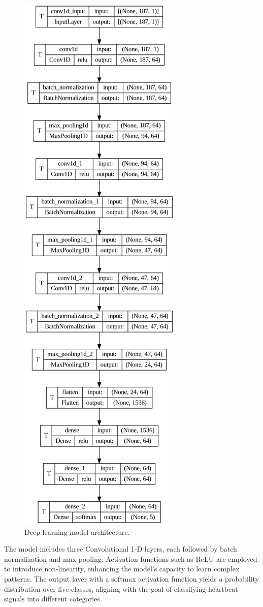 \documentclass[]{acmsiggraph}
\begin{document}
\begin{figure}[h]\centering
 \includegraphics[width=0.5\linewidth]{images/cnn.png}
 \caption{\label{fig:reference}Deep learning model architecture.}
\end{figure}

The model includes three Convolutional 1-D layers, each followed by batch normalization and max pooling. Activation functions such as ReLU are employed to introduce non-linearity, enhancing the model's capacity to learn complex patterns. The output layer with a softmax activation function yields a probability distribution over five classes, aligning with the goal of classifying heartbeat signals into different categories.
\end{document}
